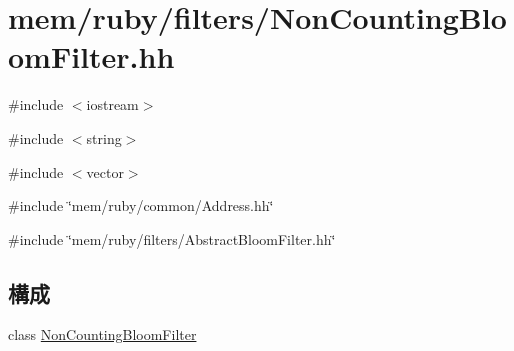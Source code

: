 \hypertarget{NonCountingBloomFilter_8hh}{
\section{mem/ruby/filters/NonCountingBloomFilter.hh}
\label{NonCountingBloomFilter_8hh}
}
{\ttfamily \#include $<$iostream$>$}\par
{\ttfamily \#include $<$string$>$}\par
{\ttfamily \#include $<$vector$>$}\par
{\ttfamily \#include \char`\"{}mem/ruby/common/Address.hh\char`\"{}}\par
{\ttfamily \#include \char`\"{}mem/ruby/filters/AbstractBloomFilter.hh\char`\"{}}\par
\subsection*{構成}
\begin{DoxyCompactItemize}
\item 
class \hyperlink{classNonCountingBloomFilter}{NonCountingBloomFilter}
\end{DoxyCompactItemize}
